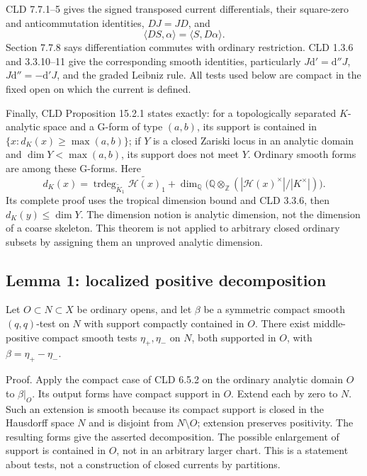 \documentclass[11pt]{article}
\begin{document}
CLD 7.7.1--5 gives the signed transposed current differentials, their square-zero and anticommutation identities, \(DJ=JD\), and
\[
 \langle DS,\alpha\rangle=\langle S,D\alpha\rangle.
\]
Section 7.7.8 says differentiation commutes with ordinary restriction. CLD 1.3.6 and 3.3.10--11 give the corresponding smooth identities, particularly \(J\mathrm d'=\mathrm d''J\), \(J\mathrm d''=-\mathrm d'J\), and the graded Leibniz rule. All tests used below are compact in the fixed open on which the current is defined.

Finally, CLD Proposition 15.2.1 states exactly: for a topologically separated \(K\)-analytic space and a G-form of type \((a,b)\), its support is contained in \(\{x:d_K(x)\geq\max(a,b)\}\); if \(Y\) is a closed Zariski locus in an analytic domain and \(\dim Y<\max(a,b)\), its support does not meet \(Y\). Ordinary smooth forms are among these G-forms. Here
\[
 d_K(x)=\operatorname{trdeg}_{\widetilde K_1}\widetilde{\mathscr H(x)}_1
 +\dim_{\mathbb Q}\bigl(\mathbb Q\otimes_{\mathbb Z}(|\mathscr H(x)^\times|/|K^\times|)\bigr).
\]
Its complete proof uses the tropical dimension bound and CLD 3.3.6, then \(d_K(y)\leq\dim Y\). The dimension notion is analytic dimension, not the dimension of a coarse skeleton. This theorem is not applied to arbitrary closed ordinary subsets by assigning them an unproved analytic dimension.

\subsection{Lemma 1: localized positive decomposition}

Let \(O\subset N\subset X\) be ordinary opens, and let \(\beta\) be a symmetric compact smooth \((q,q)\)-test on \(N\) with support compactly contained in \(O\). There exist middle-positive compact smooth tests \(\eta_+,\eta_-\) on \(N\), both supported in \(O\), with \(\beta=\eta_+-\eta_-\).

Proof. Apply the compact case of CLD 6.5.2 on the ordinary analytic domain \(O\) to \(\beta|_O\). Its output forms have compact support in \(O\). Extend each by zero to \(N\). Such an extension is smooth because its compact support is closed in the Hausdorff space \(N\) and is disjoint from \(N\setminus O\); extension preserves positivity. The resulting forms give the asserted decomposition. The possible enlargement of support is contained in \(O\), not in an arbitrary larger chart. This is a statement about tests, not a construction of closed currents by partitions.
\end{document}
